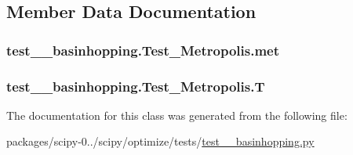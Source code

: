 \subsection{Member Data Documentation}
\hypertarget{classtest____basinhopping_1_1Test__Metropolis_a102e62d6f2b838d348368a163d4f6ae0}{}
\subsubsection[{met}]{\setlength{\rightskip}{0pt plus 5cm}test\+\_\+\+\_\+basinhopping.\+Test\+\_\+\+Metropolis.\+met}\label{classtest____basinhopping_1_1Test__Metropolis_a102e62d6f2b838d348368a163d4f6ae0}
\hypertarget{classtest____basinhopping_1_1Test__Metropolis_aa78cc31f813ee05ff584deefbf51e2ba}{}
\subsubsection[{T}]{\setlength{\rightskip}{0pt plus 5cm}test\+\_\+\+\_\+basinhopping.\+Test\+\_\+\+Metropolis.\+T}\label{classtest____basinhopping_1_1Test__Metropolis_aa78cc31f813ee05ff584deefbf51e2ba}


The documentation for this class was generated from the following file\+:\begin{DoxyCompactItemize}
\item 
packages/scipy-\/0../scipy/optimize/tests/\hyperlink{test____basinhopping_8py}{test\+\_\+\+\_\+basinhopping.\+py}\end{DoxyCompactItemize}
